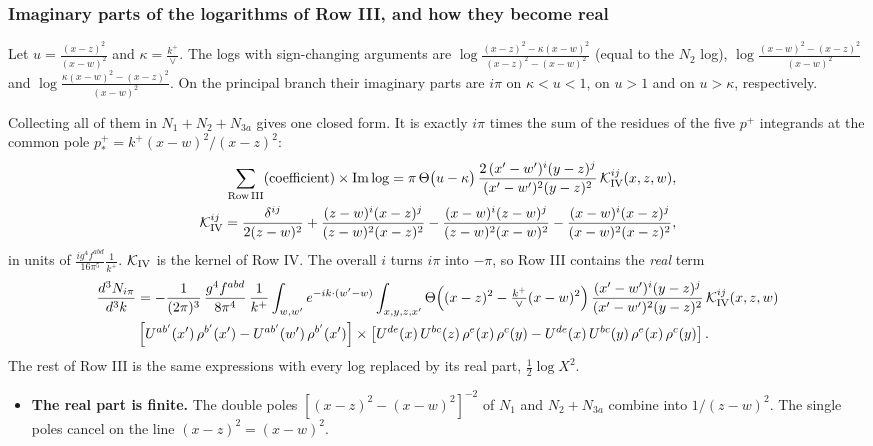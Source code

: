 \documentclass[9pt]{article}
\numberwithin{equation}{section}
\begin{document}
{\color{red}
\subsubsection*{Imaginary parts of the logarithms of Row III, and how they become real}
Let $u=\frac{(x-z)^{2}}{(x-w)^{2}}$ and $\kappa=\frac{k^{+}}{\vee}$. The logs with sign-changing arguments are $\log\frac{(x-z)^{2}-\kappa(x-w)^{2}}{(x-z)^{2}-(x-w)^{2}}$ (equal to the $N_{2}$ log), $\log\frac{(x-w)^{2}-(x-z)^{2}}{(x-w)^{2}}$ and $\log\frac{\kappa(x-w)^{2}-(x-z)^{2}}{(x-w)^{2}}$. On the principal branch their imaginary parts are $i\pi$ on $\kappa<u<1$, on $u>1$ and on $u>\kappa$, respectively.

Collecting all of them in $N_{1}+N_{2}+N_{3a}$ gives one closed form. It is exactly $i\pi$ times the sum of the residues of the five $p^{+}$ integrands at the common pole $p^{+}_{*}=k^{+}(x-w)^{2}/(x-z)^{2}$:
\begin{align}
\sum_{\rm Row\,III}({\rm coefficient})\times{\rm Im}\log = \pi\,\Theta\big(u-\kappa\big)\,\frac{2\,(x'-w')^{i}(y-z)^{j}}{(x'-w')^{2}(y-z)^{2}}\,\mathcal K^{ij}_{\rm IV}(x,z,w),\notag\\
\mathcal K^{ij}_{\rm IV}=\frac{\delta^{ij}}{2(z-w)^{2}}+\frac{(z-w)^{i}(x-z)^{j}}{(z-w)^{2}(x-z)^{2}}-\frac{(x-w)^{i}(z-w)^{j}}{(z-w)^{2}(x-w)^{2}}-\frac{(x-w)^{i}(x-z)^{j}}{(x-w)^{2}(x-z)^{2}},
\end{align}
in units of $\frac{ig^{4}f^{abd}}{16\pi^{5}}\frac{1}{k^{+}}$. $\mathcal K_{\rm IV}$ is the kernel of Row IV. The overall $i$ turns $i\pi$ into $-\pi$, so Row III contains the \emph{real} term
\begin{align}
\frac{d^{3}N_{i\pi}}{d^{3}k} & = -\frac{1}{(2\pi)^{3}}\,\frac{g^{4}f^{abd}}{8\pi^{4}}\,\frac{1}{k^{+}}\int_{w,w'}e^{-ik\cdot(w'-w)}\int_{x,y,z,x'}\Theta\Big((x-z)^{2}-\tfrac{k^{+}}{\vee}(x-w)^{2}\Big)\,\frac{(x'-w')^{i}(y-z)^{j}}{(x'-w')^{2}(y-z)^{2}}\,\mathcal K^{ij}_{\rm IV}(x,z,w)\notag \\ & \left[U^{ab'}(x')\,\rho^{b'}(x')-U^{ab'}(w')\, \rho^{b'}(x')\right]\times \left[U^{de}(x)\,U^{bc}(z)\, \rho^{e}(x)\,\rho^{c}(y)-U^{de}(x)\,U^{bc}(y)\,\rho^{e}(x)\,\rho^{c}(y)\right].
\end{align}
The rest of Row III is the same expressions with every log replaced by its real part, $\frac12\log X^{2}$.
\begin{itemize}
\item \textbf{The real part is finite.} The double poles $[(x-z)^{2}-(x-w)^{2}]^{-2}$ of $N_{1}$ and $N_{2}+N_{3a}$ combine into $1/(z-w)^{2}$. The single poles cancel on the line $(x-z)^{2}=(x-w)^{2}$.

\end{itemize}}
\end{document}

